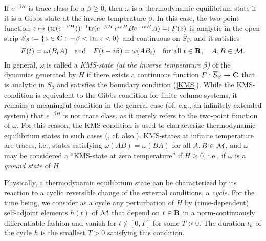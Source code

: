 \documentclass[a4paper,11pt]{article}
\renewcommand{\forall}{\mbox{for all}\,\,}
\def\dt{\cal}
\def\dM{{\dt M}}
\def\go{\omega}
\def\complex{{\bf C}}
\def\Im{{\rm Im}\,}
\def\reals{{\bf R}}
\def\tr{{\rm tr}}
\begin{document}
If $e^{-\beta H}$ is trace class for a $\beta\geq0$, then
$\go$ is a thermodynamic equilibrium state if
it is a Gibbs state at the inverse temperature $\beta$.
In this case,
the two-point
function $z\mapsto(\tr(e^{-\beta H}))^{-1}\tr(e^{-\beta H}\,
e^{izH}Be^{-izH}A)=:F(z)$ is
analytic in the open strip
$S_\beta:=\{z\in\complex:\,-\beta<\Im z<0\}$
and continuous on $\overline{S}_\beta$, and it
satisfies
\begin{equation}\label{KMS}
F(t)=\go(B_t A)\quad\mbox{and}\quad
F(t-i\beta)=\go(AB_t)\quad\forall t\in\reals,\quad A,B\in\dM.
\end{equation}
In general, $\go$ is called a
{\it KMS-state (at the inverse temperature $\beta$)} of the dynamics generated
by $H$ if there exists a continuous function $F:\overline{S}_\beta\to\complex$
that is analytic in $S_\beta$ and satisfies the boundary condition (\ref{KMS}).
While the KMS-condition is equivalent to the Gibbs condition for
finite volume systems, it remains a
meaningful condition in the general
case (of, e.g., an infinitely extended system)
that $e^{-\beta H}$ is not trace class,
as it merely refers to the two-point function of $\go$.
For this reason, the KMS-condition is used to characterize
thermodynamic equilibrium states in such cases (\cite{HHW},
cf. also \cite{Haa92}). KMS-states at infinite temperature
are traces, i.e., states satisfying $\go(AB)=\go(BA)$ for all
$A,B\in\dM$, and
$\go$ may be considered a ``KMS-state at zero temperature''
if $H\geq0$, i.e., if $\go$ is a {\it ground state} of $H$.

Physically, a thermodynamic equilibrium state can be
characterized by its reaction to a cyclic reversible change of
the external conditions, a {\em cycle}.
For the time being, we consider as
a cycle any perturbation of
$H$ by (time-dependent) self-adjoint elements $h(t)$ of $\dM$
that depend on $t\in\reals$ in a norm-continuously differentiable
fashion and vanish for $t\notin[0,T]$
for some $T>0$. The duration $t_h$ of the cycle $h$ is the
smallest $T>0$ satisfying this condition.
\end{document}
